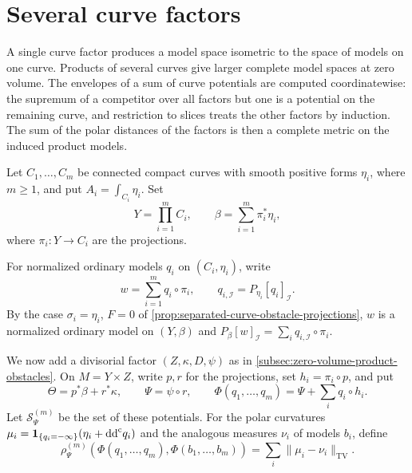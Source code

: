 \section{Several curve factors}
\label{subsec:separated-curve-product-models}

A single curve factor produces a model space isometric to the space of models on one curve. Products of several curves give larger complete model spaces at zero volume. The envelopes of a sum of curve potentials are computed coordinatewise: the supremum of a competitor over all factors but one is a potential on the remaining curve, and restriction to slices treats the other factors by induction. The sum of the polar distances of the factors is then a complete metric on the induced product models.

Let $C_1,\ldots,C_m$ be connected compact curves with smooth positive forms $\eta_i$, where $m\geq1$, and put $A_i=\int_{C_i}\eta_i$. Set
\[
 Y=\prod_{i=1}^m C_i,\qquad
 \beta=\sum_{i=1}^m\pi_i^*\eta_i,
\]
where $\pi_i\colon Y\to C_i$ are the projections.



For normalized ordinary models $q_i$ on $(C_i,\eta_i)$, write
\[
 w=\sum_{i=1}^m q_i\circ\pi_i,\qquad
 q_{i,\mathcal I}=P_{\eta_i}[q_i]_{\mathcal I}.
\]
By the case $\sigma_i=\eta_i$, $F=0$ of \cref{prop:separated-curve-obstacle-projections}, $w$ is a normalized ordinary model on $(Y,\beta)$ and $P_\beta[w]_{\mathcal I}=\sum_iq_{i,\mathcal I}\circ\pi_i$.

We now add a divisorial factor $(Z,\kappa,D,\psi)$ as in \cref{subsec:zero-volume-product-obstacles}. On $M=Y\times Z$, write $p,r$ for the projections, set $h_i=\pi_i\circ p$, and put
\[
 \Theta=p^*\beta+r^*\kappa,\qquad
 \Psi=\psi\circ r,\qquad
 \Phi(q_1,\ldots,q_m)=\Psi+\sum_i q_i\circ h_i.
\]
Let $\mathcal S_\Psi^{(m)}$ be the set of these potentials. For the polar curvatures $\mu_i=\mathbf1_{\{q_i=-\infty\}}(\eta_i+\mathrm{dd}^{\mathrm{c}} q_i)$ and the analogous measures $\nu_i$ of models $b_i$, define
\begin{equation}\label{eq:separated-product-polar-metric}
 \rho_\Psi^{(m)}(\Phi(q_1,\ldots,q_m),\Phi(b_1,\ldots,b_m))
       =\sum_i\|\mu_i-\nu_i\|_{\mathrm{TV}}.
\end{equation}

